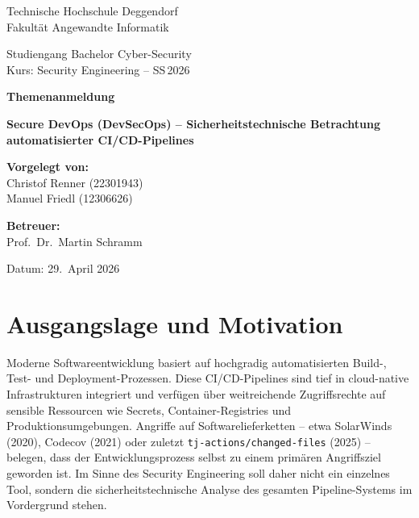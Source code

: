 \documentclass[12pt, a4paper]{scrartcl}
\newcommand{\faculty}{Fakultät Angewandte Informatik}
\newcommand{\studies}{Bachelor Cyber-Security}
\newcommand{\coursetitle}{Security Engineering}
\newcommand{\semester}{SS\,2026}
\newcommand{\projecttitle}{Secure DevOps (DevSecOps) -- Sicherheitstechnische Betrachtung automatisierter CI/CD-Pipelines}
\newcommand{\supervisor}{Prof.\ Dr.\ Martin Schramm}
\newcommand{\studentA}{Christof Renner (22301943)}
\newcommand{\studentB}{Manuel Friedl (12306626)}
\newcommand{\submissiondate}{29.\ April 2026}
\begin{document}
\begin{titlepage}
  \centering
  \vspace*{1cm}
  {\LARGE Technische Hochschule Deggendorf\\[0.2cm]
   \large \faculty\par}
  \vspace{0.4cm}
  {\Large Studiengang \studies\\[0.3cm]
   Kurs: \coursetitle{} -- \semester\par}
  \vspace{2.5cm}
  {\huge\bfseries\color{thblue} Themenanmeldung\par}
  \vspace{1.5cm}
  {\LARGE\bfseries \projecttitle\par}
  \vfill
  \begin{minipage}[t]{0.48\textwidth}
    \textbf{Vorgelegt von:}\\[6pt]
    \studentA\\
    \studentB
  \end{minipage}\hfill
  \begin{minipage}[t]{0.48\textwidth}\raggedleft
    \textbf{Betreuer:}\\[6pt]
    \supervisor
  \end{minipage}
  \vspace{1.5cm}

  Datum: \submissiondate
\end{titlepage}


\section*{Ausgangslage und Motivation}
Moderne Softwareentwicklung basiert auf hochgradig automatisierten Build-, Test- und
Deployment-Prozessen. Diese CI/CD-Pipelines sind tief in cloud-native Infrastrukturen
integriert und verfügen über weitreichende Zugriffsrechte auf sensible Ressourcen wie
Secrets, Container-Registries und Produktionsumgebungen. Angriffe auf
Softwarelieferketten -- etwa SolarWinds (2020), Codecov (2021) oder zuletzt
\texttt{tj-actions/changed-files} (2025) -- belegen, dass der Entwicklungsprozess
selbst zu einem primären Angriffsziel geworden ist. Im Sinne des Security Engineering
soll daher nicht ein einzelnes Tool, sondern die sicherheitstechnische Analyse des
gesamten Pipeline-Systems im Vordergrund stehen.
\end{document}
